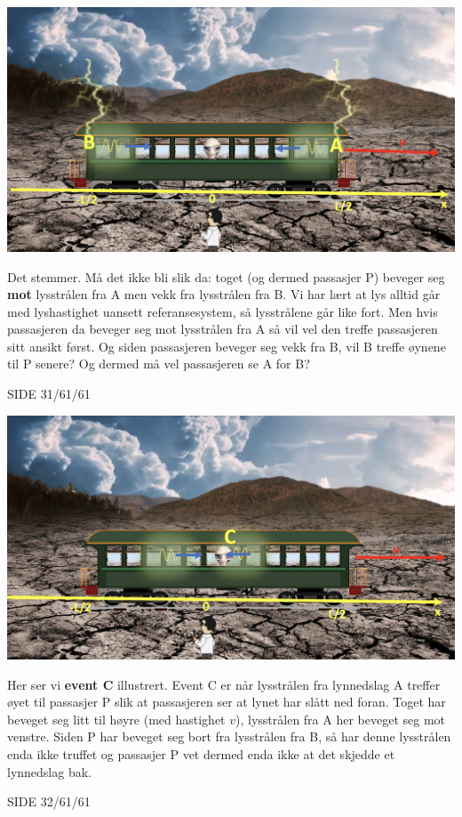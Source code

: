 \documentclass{beamer}
\begin{document}
\begin{frame}
{
\centerline{\includegraphics[scale=0.26]{media/tog1.png}}
Det stemmer. Må det ikke bli slik da: toget (og dermed passasjer P) beveger seg {\bf mot} lysstrålen fra A men vekk fra lysstrålen fra B. Vi har lært at lys alltid går med lyshastighet uansett referansesystem, så lysstrålene går like fort. Men hvis passasjeren da beveger seg mot lysstrålen fra A så vil vel den treffe passasjeren sitt ansikt først. Og siden passasjeren beveger seg vekk fra B, vil B treffe øynene til P senere? Og dermed må vel passasjeren se A for B?
}{SIDE 31/61/61}

{
\centerline{\includegraphics[scale=0.26]{media/tog2.png}}
Her ser vi {\bf event C} illustrert. Event C er når lysstrålen fra lynnedslag A treffer øyet til passasjer P slik at passasjeren ser at lynet har slått ned foran. Toget har beveget seg litt til høyre (med hastighet $v$), lysstrålen fra A her beveget seg mot venstre. Siden P har beveget seg bort fra lysstrålen fra B, så har denne lysstrålen enda ikke truffet og passasjer P vet dermed enda ikke at det skjedde et lynnedslag bak.
}{SIDE 32/61/61}



\end{frame}
\end{document}

